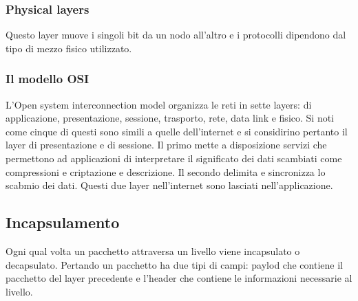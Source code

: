 \subsubsection{Physical layers}
Questo layer muove i singoli bit da un nodo all'altro e i protocolli dipendono dal tipo di mezzo fisico utilizzato.
\subsubsection{Il modello OSI}
L'Open system interconnection model organizza le reti in sette layers: di applicazione, presentazione, sessione, trasporto, rete, data link e fisico. Si noti come cinque di questi sono simili a quelle dell'internet
e si considirino pertanto il layer di presentazione e di sessione. Il primo mette a disposizione servizi che permettono ad applicazioni di interpretare il significato dei dati scambiati come compressioni e 
criptazione e descrizione. Il secondo delimita e sincronizza lo scabmio dei dati. Questi due layer nell'internet sono lasciati nell'applicazione. 
\subsection{Incapsulamento}
Ogni qual volta un pacchetto attraversa un livello viene incapsulato o decapsulato. Pertando un pacchetto ha due tipi di campi: paylod che contiene il pacchetto del layer precedente e l'header che contiene le 
informazioni necessarie al livello. 
